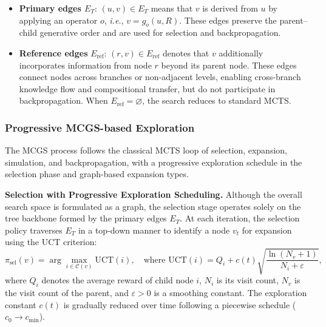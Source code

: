 \begin{itemize}[leftmargin=*]
    \item \textbf{Primary edges $E_{T}$}: $(u,v) \in E_{T}$ means that $v$ is derived from $u$ by applying an operator $o$, \textit{i.e.}, $v = g_{o}(u, R)$. These edges preserve the parent--child generative order and are used for selection and backpropagation.
    \item \textbf{Reference edges} $E_{\text{ref}}$: $(r,v) \in E_{\text{ref}}$ denotes that $v$ additionally incorporates information from node $r$ beyond its parent node. These edges connect nodes across branches or non-adjacent levels, enabling cross-branch knowledge flow and compositional transfer, but do not participate in backpropagation. When $E_{\text{ref}}=\varnothing$, the search reduces to standard MCTS.
\end{itemize}




\subsubsection{Progressive MCGS-based Exploration}
\label{sec:mcgs_exploration}

The MCGS process follows the classical MCTS loop of selection, expansion, simulation, and backpropagation, with a progressive exploration schedule in the selection phase and graph-based expansion types.

\textbf{Selection with Progressive Exploration Scheduling.}
\label{sec:entropy}
Although the overall search space is formulated as a graph, the selection stage operates solely on the tree backbone formed by the primary edges $E_T$. At each iteration, the selection policy traverses $E_T$ in a top-down manner to identify a node $v_t$ for expansion using the UCT criterion:
\begin{equation}
\pi_{\text{sel}}(v) = \arg\max_{i \in \mathcal{C}(v)} \text{UCT}(i),
\quad \text{where } \text{UCT}(i) = Q_i + c(t) \sqrt{\frac{\ln (N_v + 1)}{N_i + \varepsilon}},
\end{equation}
where $Q_i$ denotes the average reward of child node $i$, $N_i$ is its visit count, $N_v$ is the visit count of the parent, and $\varepsilon > 0$ is a smoothing constant. The exploration constant $c(t)$ is gradually reduced over time following a piecewise schedule ($c_0 \rightarrow c_{\min}$).

